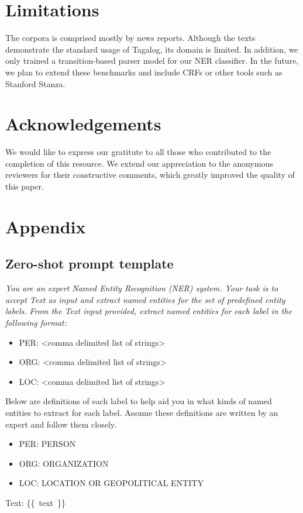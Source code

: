 \documentclass[11pt]{article}
\begin{document}
\section*{Limitations}

The \tlunified{} corpora is comprised mostly by news reports.
Although the texts demonstrate the standard usage of Tagalog, its domain is limited.
In addition, we only trained a transition-based parser model for our NER classifier.
In the future, we plan to extend these benchmarks and include CRFs or other tools such as Stanford Stanza.

\section*{Acknowledgements}

We would like to express our gratitute to all those who contributed to the completion of this resource.
We extend our appreciation to the anonymous reviewers for their constructive comments, which greatly improved the quality of this paper. 




\appendix

\section{Appendix}

\subsection{Zero-shot prompt template}
\label{appendix:prompt}

{
\itshape
You are an expert Named Entity Recognition 
(NER) system. Your task is to accept Text as 
input and extract named entities for the set 
of predefined entity labels. From the Text 
input provided, extract named entities for 
each label in the following format:

\begin{itemize}[noitemsep,topsep=0pt]
\item PER: <comma delimited list of strings>
\item ORG: <comma delimited list of strings>
\item LOC: <comma delimited list of strings>
\end{itemize}

Below are definitions of each label to help 
aid you in what kinds of named entities to 
extract for each label. Assume these 
definitions are written by an expert and 
follow them closely.

\begin{itemize}[noitemsep,topsep=0pt]
\item PER: PERSON
\item ORG: ORGANIZATION
\item LOC: LOCATION OR GEOPOLITICAL ENTITY
\end{itemize}

Text: \{\{~text~\}\}
}
\end{document}
